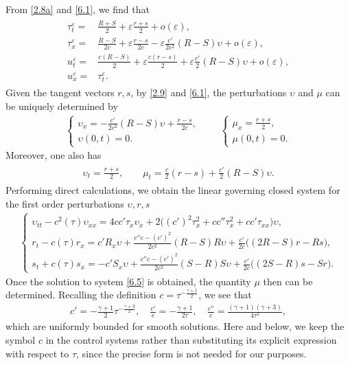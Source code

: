 \documentclass[11pt,reqno]{article}
\newcommand{\eps}{\varepsilon}
\newcommand{\dps}{\displaystyle}
\newcommand{\fr}{\frac}
\numberwithin{equation}{section}
\begin{document}
From \eqref{2.8a} and \eqref{6.1}, we find that
\begin{align}\label{6.2}
\begin{split}
\dps \tau_{t}^\eps=&\fr{R+S}{2}+\eps\fr{r+s}{2}+o(\eps),\\[4pt]
\dps \tau_{x}^\eps=&\fr{R-S}{2c}+\eps\fr{r-s}{2c}-\eps\fr{c'}{2c^2}(R-S)\upsilon+o(\eps), \\[4pt]
\dps u_{t}^\eps=&\fr{c(R-S)}{2}+\eps\fr{c(r-s)}{2}+\eps\fr{c'}{2}(R-S)\upsilon+o(\eps), \\[4pt]
u_{x}^\eps=&\tau_{t}^\eps.
\end{split}
\end{align}
Given the tangent vectors $r,s$, by \eqref{2.9} and \eqref{6.1}, the perturbations $\upsilon$ and $\mu$ can be uniquely determined by
\begin{align}\label{6.3}
\left\{
\begin{array}{l}
\dps \upsilon_x=-\fr{c'}{2c^2}(R-S)\upsilon +\fr{r-s}{2c}, \\[6pt]
\dps \upsilon(0,t)=0.
\end{array}
\right.
\qquad
\left\{
\begin{array}{l}
\dps \mu_x=\fr{r+s}{2}, \\[6pt]
\dps \mu(0,t)=0.
\end{array}
\right.
\end{align}
Moreover, one also has
\begin{align}\label{6.4}
\begin{split}
\upsilon_t=\fr{r+s}{2},\qquad \mu_t=\fr{c}{2}(r-s)+\fr{c'}{2}(R-S)\upsilon.
\end{split}
\end{align}
Performing direct calculations, we obtain the linear governing closed system for the first order perturbations $\upsilon, r, s$
\begin{align}\label{6.5}
\left\{
\begin{array}{l}
\dps \upsilon_{tt}-c^2(\tau)\upsilon_{xx}=4c c'\tau_x\upsilon_x +2\Big((c')^2\tau_{x}^2 +cc''\tau_{x}^2 +cc'\tau_{xx}\Big)\upsilon, \\[8pt]
\dps r_t-c(\tau)r_x=c'R_x\upsilon +\fr{c''c-(c')^2}{2c^2}(R-S)R\upsilon +\fr{c'}{2c}\Big((2R-S)r -Rs\Big), \\[8pt]
\dps s_t+c(\tau)s_x=-c'S_x\upsilon +\fr{c''c-(c')^2}{2c^2}(S-R)S\upsilon +\fr{c'}{2c}\Big((2S-R)s -Sr\Big).
\end{array}
\right.
\end{align}
Once the solution to system \eqref{6.5} is obtained, the quantity $\mu$ then can be determined.
Recalling the definition $c=\tau^{-\fr{\gamma+1}{2}}$, we see that
\begin{align}\label{6.6}
c'=-\fr{\gamma+1}{2}\tau^{-\fr{\gamma+3}{2}},\quad \fr{c'}{c}=-\fr{\gamma+1}{2\tau},\quad \fr{c''}{c}=\fr{(\gamma+1)(\gamma+3)}{4\tau^2},
\end{align}
which are uniformly bounded for smooth solutions. Here and below, we keep the symbol $c$ in the control systems rather than substituting its explicit expression with respect to $\tau$, since the precise form is not needed for our purposes.
\end{document}
